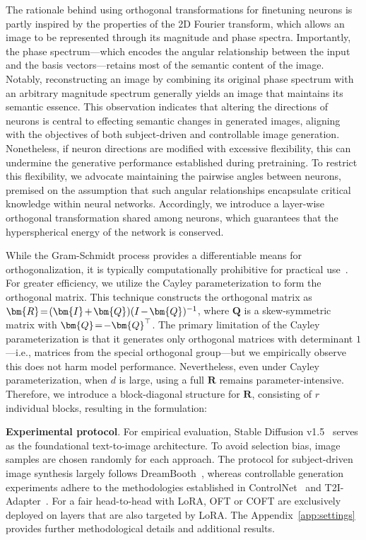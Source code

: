 The rationale behind using orthogonal transformations for finetuning neurons is partly inspired by the properties of the 2D Fourier transform, which allows an image to be represented through its magnitude and phase spectra. Importantly, the phase spectrum—which encodes the angular relationship between the input and the basis vectors—retains most of the semantic content of the image. Notably, reconstructing an image by combining its original phase spectrum with an arbitrary magnitude spectrum generally yields an image that maintains its semantic essence. This observation indicates that altering the directions of neurons is central to effecting semantic changes in generated images, aligning with the objectives of both subject-driven and controllable image generation. Nonetheless, if neuron directions are modified with excessive flexibility, this can undermine the generative performance established during pretraining. To restrict this flexibility, we advocate maintaining the pairwise angles between neurons, premised on the assumption that such angular relationships encapsulate critical knowledge within neural networks. Accordingly, we introduce a layer-wise orthogonal transformation shared among neurons, which guarantees that the hyperspherical energy of the network is conserved.

While the Gram-Schmidt process provides a differentiable means for orthogonalization, it is typically computationally prohibitive for practical use~\cite{liu2021orthogonal}. For greater efficiency, we utilize the Cayley parameterization to form the orthogonal matrix. This technique constructs the orthogonal matrix as $\thickmuskip=2mu \medmuskip=2mu \bm{R}=(\bm{I}+\bm{Q})(I-\bm{Q})^{-1}$, where $\bm{Q}$ is a skew-symmetric matrix with $\thickmuskip=2mu \medmuskip=2mu \bm{Q}=-\bm{Q}^\top$. The primary limitation of the Cayley parameterization is that it generates only orthogonal matrices with determinant $1$—i.e., matrices from the special orthogonal group—but we empirically observe this does not harm model performance. Nevertheless, even under Cayley parameterization, when $d$ is large, using a full $\bm{R}$ remains parameter-intensive. Therefore, we introduce a block-diagonal structure for $\bm{R}$, consisting of $r$ individual blocks, resulting in the formulation:

\textbf{Experimental protocol}. For empirical evaluation, Stable Diffusion v1.5~\cite{rombach2022high} serves as the foundational text-to-image architecture. To avoid selection bias, image samples are chosen randomly for each approach. The protocol for subject-driven image synthesis largely follows DreamBooth~\cite{ruiz2023dreambooth}, whereas controllable generation experiments adhere to the methodologies established in ControlNet~\cite{zhang2023adding} and T2I-Adapter~\cite{mou2023t2i}. For a fair head-to-head with LoRA, OFT or COFT are exclusively deployed on layers that are also targeted by LoRA. The Appendix~\ref{app:settings} provides further methodological details and additional results.

